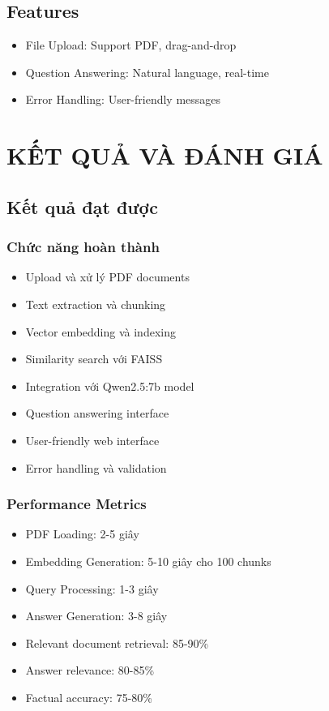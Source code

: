 \documentclass[12pt,a4paper]{report}
\begin{document}
\section{Features}
\begin{itemize}
    \item File Upload: Support PDF, drag-and-drop
    \item Question Answering: Natural language, real-time
    \item Error Handling: User-friendly messages
\end{itemize}

\newpage

\chapter{KẾT QUẢ VÀ ĐÁNH GIÁ}

\section{Kết quả đạt được}

\subsection{Chức năng hoàn thành}
\begin{itemize}
    \item[\checkmark] Upload và xử lý PDF documents
    \item[\checkmark] Text extraction và chunking
    \item[\checkmark] Vector embedding và indexing
    \item[\checkmark] Similarity search với FAISS
    \item[\checkmark] Integration với Qwen2.5:7b model
    \item[\checkmark] Question answering interface
    \item[\checkmark] User-friendly web interface
    \item[\checkmark] Error handling và validation
\end{itemize}

\subsection{Performance Metrics}
\begin{itemize}
    \item PDF Loading: 2-5 giây
    \item Embedding Generation: 5-10 giây cho 100 chunks
    \item Query Processing: 1-3 giây
    \item Answer Generation: 3-8 giây
    \item Relevant document retrieval: 85-90\%
    \item Answer relevance: 80-85\%
    \item Factual accuracy: 75-80\%
\end{itemize}
\end{document}
